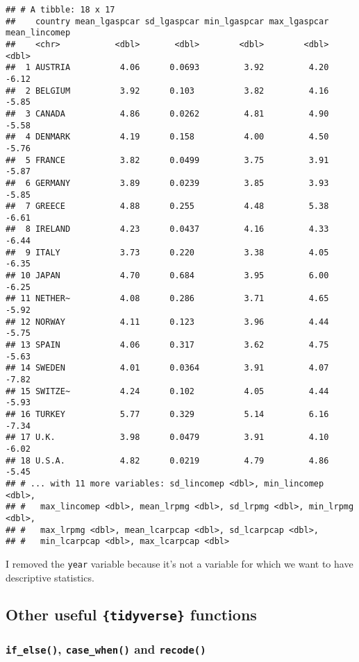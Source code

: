 \documentclass[
]{article}
\begin{document}
\begin{verbatim}
## # A tibble: 18 x 17
##    country mean_lgaspcar sd_lgaspcar min_lgaspcar max_lgaspcar mean_lincomep
##    <chr>           <dbl>       <dbl>        <dbl>        <dbl>         <dbl>
##  1 AUSTRIA          4.06      0.0693         3.92         4.20         -6.12
##  2 BELGIUM          3.92      0.103          3.82         4.16         -5.85
##  3 CANADA           4.86      0.0262         4.81         4.90         -5.58
##  4 DENMARK          4.19      0.158          4.00         4.50         -5.76
##  5 FRANCE           3.82      0.0499         3.75         3.91         -5.87
##  6 GERMANY          3.89      0.0239         3.85         3.93         -5.85
##  7 GREECE           4.88      0.255          4.48         5.38         -6.61
##  8 IRELAND          4.23      0.0437         4.16         4.33         -6.44
##  9 ITALY            3.73      0.220          3.38         4.05         -6.35
## 10 JAPAN            4.70      0.684          3.95         6.00         -6.25
## 11 NETHER~          4.08      0.286          3.71         4.65         -5.92
## 12 NORWAY           4.11      0.123          3.96         4.44         -5.75
## 13 SPAIN            4.06      0.317          3.62         4.75         -5.63
## 14 SWEDEN           4.01      0.0364         3.91         4.07         -7.82
## 15 SWITZE~          4.24      0.102          4.05         4.44         -5.93
## 16 TURKEY           5.77      0.329          5.14         6.16         -7.34
## 17 U.K.             3.98      0.0479         3.91         4.10         -6.02
## 18 U.S.A.           4.82      0.0219         4.79         4.86         -5.45
## # ... with 11 more variables: sd_lincomep <dbl>, min_lincomep <dbl>,
## #   max_lincomep <dbl>, mean_lrpmg <dbl>, sd_lrpmg <dbl>, min_lrpmg <dbl>,
## #   max_lrpmg <dbl>, mean_lcarpcap <dbl>, sd_lcarpcap <dbl>,
## #   min_lcarpcap <dbl>, max_lcarpcap <dbl>
\end{verbatim}

I removed the \texttt{year} variable because it's not a variable for which we want to have descriptive
statistics.

\hypertarget{other-useful-tidyverse-functions}{%
\subsection{\texorpdfstring{Other useful \texttt{\{tidyverse\}} functions}{Other useful \{tidyverse\} functions}}\label{other-useful-tidyverse-functions}}

\hypertarget{if_else-case_when-and-recode}{%
\subsubsection{\texorpdfstring{\texttt{if\_else()}, \texttt{case\_when()} and \texttt{recode()}}{if\_else(), case\_when() and recode()}}\label{if_else-case_when-and-recode}}
\end{document}

